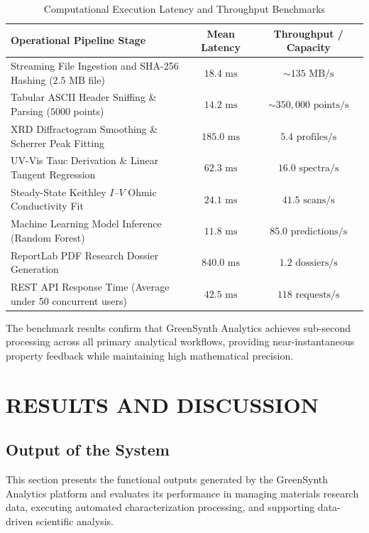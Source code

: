 \documentclass[12pt,a4paper,oneside]{report}
\begin{document}
{{{\begin{table}[!htbp]
\centering
\footnotesize
\setlength{\tabcolsep}{6pt}
\renewcommand{\arraystretch}{1.2}
\caption{Computational Execution Latency and Throughput Benchmarks}
\label{tab:perf_latency}
\begin{tabular}{|p{7.5cm}|c|c|}
\hline
\textbf{Operational Pipeline Stage} & \textbf{Mean Latency} & \textbf{Throughput / Capacity} \\
\hline
Streaming File Ingestion and SHA-256 Hashing ($2.5\text{ MB}$ file) & $18.4\text{ ms}$ & $\sim 135\text{ MB/s}$ \\
Tabular ASCII Header Sniffing \& Parsing ($5000$ points) & $14.2\text{ ms}$ & $\sim 350{,}000\text{ points/s}$ \\
XRD Diffractogram Smoothing \& Scherrer Peak Fitting & $185.0\text{ ms}$ & $5.4\text{ profiles/s}$ \\
UV-Vis Tauc Derivation \& Linear Tangent Regression & $62.3\text{ ms}$ & $16.0\text{ spectra/s}$ \\
Steady-State Keithley $I\text{--}V$ Ohmic Conductivity Fit & $24.1\text{ ms}$ & $41.5\text{ scans/s}$ \\
Machine Learning Model Inference (Random Forest) & $11.8\text{ ms}$ & $85.0\text{ predictions/s}$ \\
ReportLab PDF Research Dossier Generation & $840.0\text{ ms}$ & $1.2\text{ dossiers/s}$ \\
REST API Response Time (Average under 50 concurrent users) & $42.5\text{ ms}$ & $118\text{ requests/s}$ \\
\hline
\end{tabular}
\end{table}

The benchmark results confirm that GreenSynth Analytics achieves sub-second processing across all primary analytical workflows, providing near-instantaneous property feedback while maintaining high mathematical precision.


\chapter{RESULTS AND DISCUSSION}

\section{Output of the System}

This section presents the functional outputs generated by the GreenSynth Analytics platform and evaluates its performance in managing materials research data, executing automated characterization processing, and supporting data-driven scientific analysis.

}}}
\end{document}
